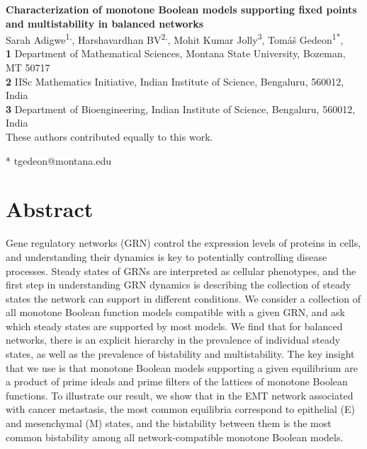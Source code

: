 \documentclass[10pt,letterpaper]{article}
\begin{document}
\vspace*{0.2in}

\begin{flushleft}
{\Large
\textbf{{Characterization of monotone Boolean models supporting fixed points and multistability in balanced networks}}}
\newline
\\
Sarah  Adigwe\textsuperscript{1,\dag},
Harshavardhan BV\textsuperscript{2,\dag},
Mohit Kumar Jolly\textsuperscript{3},
Tom\'{a}\v{s} Gedeon\textsuperscript{1*},
\\
\bigskip
\textbf{1} Department of Mathematical Sciences, Montana State University, Bozeman, MT 50717
\\
\textbf{2} IISc Mathematics Initiative, Indian Institute of Science, Bengaluru, 560012, India
\\
\textbf{3} Department of Bioengineering, Indian Institute of Science, Bengaluru, 560012, India
\\
\bigskip
\dag These authors contributed equally to this work.

* tgedeon@montana.edu


\end{flushleft}

%
\section*{Abstract}
Gene regulatory networks (GRN) control the expression levels of proteins in cells, and understanding their dynamics is key to potentially controlling disease processes. Steady states of GRNs are interpreted as cellular phenotypes, and the first step in understanding GRN dynamics is describing the collection of steady states the network can support in different conditions. We consider a collection of all monotone Boolean function models compatible with a given GRN, and ask which steady states are supported by most models. We find that for balanced networks, there is an explicit hierarchy in the prevalence of individual steady states, as well as the prevalence of bistability and multistability. The key insight that we use is that monotone Boolean models supporting a given equilibrium are a product of prime ideals and prime filters of the lattices of monotone Boolean functions. To illustrate our result, we show that in the EMT network associated with cancer metastasis, the most common equilibria correspond to epithelial (E) and mesenchymal (M) states, and the bistability between them is the most common bistability among all network-compatible monotone Boolean models.
\end{document}
